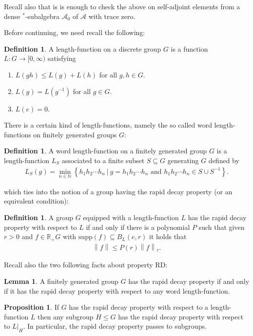 \documentclass[10pt,oneside,openany,final]{memoir}
\theoremstyle{definition}
\newtheorem{lemma}[theorem]{Lemma}
\newtheorem{proposition}[theorem]{Proposition}
\newtheorem{definition}[theorem]{Definition}
\theoremstyle{Break}
\newcommand{\lv}{\left\lVert}
\newcommand{\rv}{\right\rVert}
\newcommand{\R}{\mathbb{R}}
\newcommand{\N}{\mathbb{N}}
\newcommand{\A}{\mathcal{A}}
\begin{document}
Recall also that is is enough to check the above on self-adjoint elements from a dense $^*$-subalgebra $\A_0$ of $\A$ with trace zero.

Before continuing, we need recall the following:
\begin{definition}
	A length-function on a discrete group $G$ is a function $L \colon G \to [0,\infty)$ satisfying
		\begin{enumerate}
			\item $L(gh)\leq L(g)+L(h)$ for all $g,h \in G$.
			\item $L(g)=L(g^{-1})$ for all $ g \in G$.
			\item $L(e)=0$.
		\end{enumerate}
\end{definition}
There is a certain kind of length-functions, namely the so called word length-functions on finitely generated groups $G:$
\begin{definition}
	A word length-function on a finitely generated group $G$ is a length-function $L_S$ associated to a finite subset $S \subseteq G$ generating $G$ defined by
	\begin{align*}
		L_S(g)=\min_{n\in \N}\left\{h_1h_2\cdots h_n \ | \ g=h_1h_2\cdots h_n \text{ and }h_1h_2\cdots h_n \in S\cup S^{-1} \right\}.
	\end{align*}
\end{definition}

which ties into the notion of a group having the rapid decay property (or an equivalent condition):
\begin{definition}
A group $G$ equipped with a length-function $L$ has the rapid decay property with respect to $L$ if and only if there is a polynomial $P$ such that given $r>0$ and $f \in \R_+ G$ with $\mathrm{supp}(f) \subseteq B_L(e,r)$ it holds that
\begin{align*}
	\lv f \rv \leq P(r) \lv f \rv_\tau.
\end{align*}
\end{definition}

Recall also the two following facts about property RD:
\begin{lemma}
	A finitely generated group $G$ has the rapid decay property if and only if it has the rapid decay property with respect to any word length-function.
\end{lemma}
\begin{proposition}
	If $G$ has the rapid decay property with respect to a length-function $L$ then any subgroup $H \leq G$ has the rapid decay property with respect to $L\big|_H$. In particular, the rapid decay property passes to subgroups.
\end{proposition}
\end{document}
